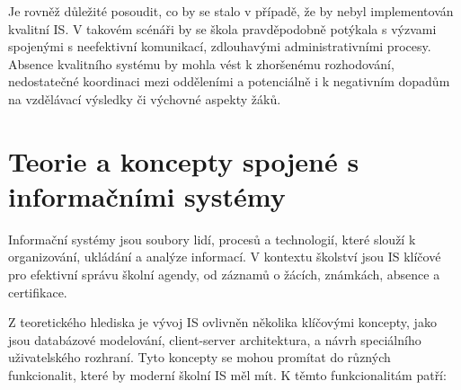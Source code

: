 \documentclass[FM,Proj]{tulthesis}
\begin{document}
Je rovněž důležité posoudit, co by se stalo v případě, že by nebyl 
implementován kvalitní IS. V takovém scénáři by se 
škola pravděpodobně potýkala s výzvami spojenými s neefektivní 
komunikací, zdlouhavými administrativními procesy. Absence kvalitního 
systému by mohla vést k zhoršenému rozhodování, nedostatečné 
koordinaci mezi odděleními a potenciálně i k negativním dopadům 
na vzdělávací výsledky či výchovné aspekty žáků.

\section{Teorie a koncepty spojené s informačními systémy}
Informační systémy jsou soubory lidí, procesů a technologií, které slouží k
organizování, ukládání a analýze informací. V kontextu školství jsou
IS klíčové pro efektivní správu školní agendy, od záznamů o žácích, 
známkách, absence a certifikace.

Z teoretického hlediska je vývoj IS ovlivněn několika klíčovými
koncepty, jako jsou databázové modelování, client-server architektura, a návrh speciálního
uživatelského rozhraní. Tyto koncepty se mohou promítat do různých funkcionalit, 
které by moderní školní IS měl mít. K těmto funkcionalitám patří:
\end{document}
